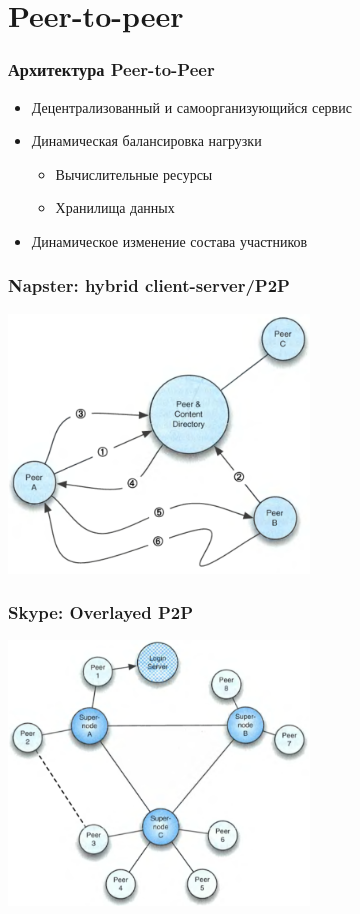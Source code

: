 \documentclass[xetex,mathserif,serif]{beamer}
\begin{document}
	\section{Peer-to-peer}

	\begin{frame}
		\frametitle{Архитектура Peer-to-Peer}
		\begin{itemize}
			\item Децентрализованный и самоорганизующийся сервис
			\item Динамическая балансировка нагрузки
			\begin{itemize}
				\item Вычислительные ресурсы
				\item Хранилища данных
			\end{itemize}
			\item Динамическое изменение состава участников
		\end{itemize}
	\end{frame}

	\begin{frame}
		\frametitle{Napster: hybrid client-server/P2P}
		\begin{center}
			\includegraphics[width=0.6\textwidth]{napster.png}
		\end{center}
	\end{frame}

	\begin{frame}
		\frametitle{Skype: Overlayed P2P}
		\begin{center}
			\includegraphics[width=0.6\textwidth]{skype.png}
		\end{center}
	\end{frame}
\end{document}
